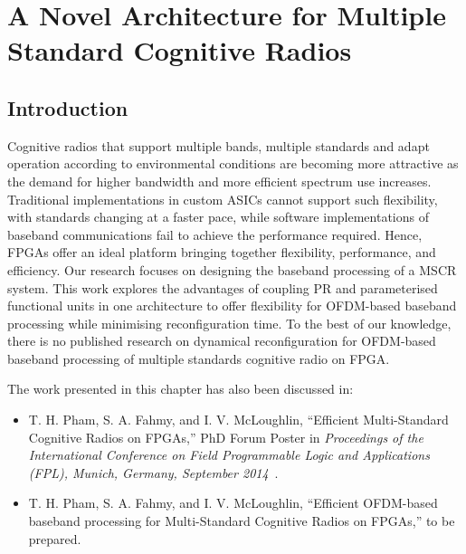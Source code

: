 \chapter{A Novel Architecture for Multiple Standard Cognitive Radios}
\label{chap:MSCR}

\section{Introduction}
Cognitive radios that support multiple bands, multiple standards and adapt operation according to environmental conditions are becoming more attractive as the demand for higher bandwidth
and more efficient spectrum use increases. 
Traditional implementations in custom ASICs cannot support such flexibility, with standards changing at a faster pace, while software implementations of baseband communications fail to achieve the performance required.
Hence, FPGAs offer an ideal platform bringing together flexibility, performance, and efficiency.
Our research focuses on designing the baseband processing of a MSCR system.
This work explores the advantages of coupling PR and parameterised functional units in one architecture to offer flexibility for OFDM-based baseband processing while minimising reconfiguration time. 
To the best of our knowledge, there is no published research on dynamical reconfiguration for OFDM-based baseband processing of multiple standards cognitive radio on FPGA.

The work presented in this chapter has also been discussed in:
\begin{itemize}
\item T. H. Pham, S. A. Fahmy, and I. V. McLoughlin, ``Efficient Multi-Standard Cognitive Radios on FPGAs,'' PhD Forum Poster in \textit{Proceedings of the International Conference on Field Programmable Logic and Applications (FPL), Munich, Germany, September 2014}~\cite{Pham2014a}.
\item T. H. Pham, S. A. Fahmy, and I. V. McLoughlin, ``Efficient OFDM-based baseband processing for Multi-Standard Cognitive Radios on FPGAs,'' to be prepared.
\end{itemize}
